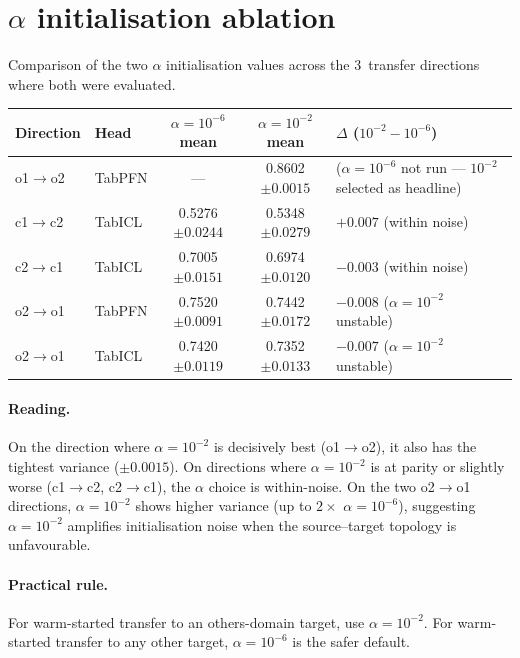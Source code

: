 \documentclass{article}
\begin{document}
\section{$\alpha$ initialisation ablation}
\label{app:alpha}

Comparison of the two $\alpha$ initialisation values across the 3~transfer directions where both were evaluated.

\begin{table}[h]
  \centering
  \small
  \begin{tabular}{@{}llccL{4.2cm}@{}}
    \toprule
    Direction  & Head    & $\alpha{=}10^{-6}$ mean & $\alpha{=}10^{-2}$ mean & $\Delta$ ($10^{-2} - 10^{-6}$) \\
    \midrule
    o1$\to$o2  & TabPFN  & ---                     & 0.8602 $\pm 0.0015$        & ($\alpha{=}10^{-6}$ not run --- $10^{-2}$ selected as headline) \\
    c1$\to$c2  & TabICL  & 0.5276 $\pm 0.0244$     & 0.5348 $\pm 0.0279$        & $+0.007$ (within noise) \\
    c2$\to$c1  & TabICL  & 0.7005 $\pm 0.0151$     & 0.6974 $\pm 0.0120$        & $-0.003$ (within noise) \\
    o2$\to$o1  & TabPFN  & 0.7520 $\pm 0.0091$     & 0.7442 $\pm 0.0172$        & $-0.008$ ($\alpha{=}10^{-2}$ unstable) \\
    o2$\to$o1  & TabICL  & 0.7420 $\pm 0.0119$     & 0.7352 $\pm 0.0133$        & $-0.007$ ($\alpha{=}10^{-2}$ unstable) \\
    \bottomrule
  \end{tabular}
\end{table}

\paragraph{Reading.}
On the direction where $\alpha{=}10^{-2}$ is decisively best (o1$\to$o2), it also has the tightest variance ($\pm 0.0015$). On directions where $\alpha{=}10^{-2}$ is at parity or slightly worse (c1$\to$c2, c2$\to$c1), the $\alpha$ choice is within-noise. On the two o2$\to$o1 directions, $\alpha{=}10^{-2}$ shows higher variance (up to $2\times$ $\alpha{=}10^{-6}$), suggesting $\alpha{=}10^{-2}$ amplifies initialisation noise when the source--target topology is unfavourable.

\paragraph{Practical rule.}
For warm-started transfer to an others-domain target, use $\alpha{=}10^{-2}$. For warm-started transfer to any other target, $\alpha{=}10^{-6}$ is the safer default.
\end{document}
